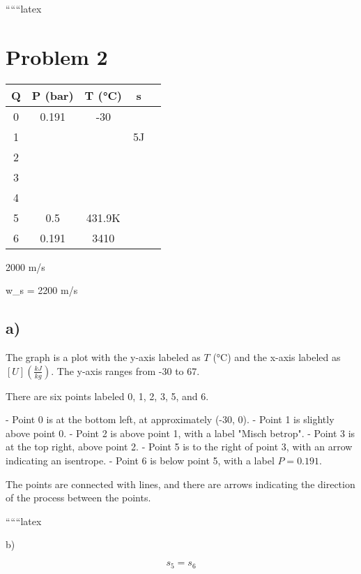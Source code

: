 
``````latex


\section*{Problem 2}

\begin{tabular}{|c|c|c|c|c|}
\hline
Q & P (bar) & T (°C) & s & \\
\hline
0 & 0.191 & -30 & & \\
\hline
1 & & & 5J & \\
\hline
2 & & & & \\
\hline
3 & & & & \\
\hline
4 & & & & \\
\hline
5 & 0.5 & 431.9K & & \\
\hline
6 & 0.191 & 3410 & & \\
\hline
\end{tabular}

\begin{flushright}
2000 m/s \\
\end{flushright}

\begin{flushright}
w_s = 2200 m/s \\
\end{flushright}

\subsection*{a)}

The graph is a plot with the y-axis labeled as \( T \) (°C) and the x-axis labeled as \( [U] \left( \frac{kJ}{kg} \right) \). The y-axis ranges from -30 to 67. 

There are six points labeled 0, 1, 2, 3, 5, and 6. 

- Point 0 is at the bottom left, at approximately (-30, 0).
- Point 1 is slightly above point 0.
- Point 2 is above point 1, with a label "Misch betrop".
- Point 3 is at the top right, above point 2.
- Point 5 is to the right of point 3, with an arrow indicating an isentrope.
- Point 6 is below point 5, with a label \( P = 0.191 \).

The points are connected with lines, and there are arrows indicating the direction of the process between the points.

``````latex

b)

\[
s_5 = s_6
\]

